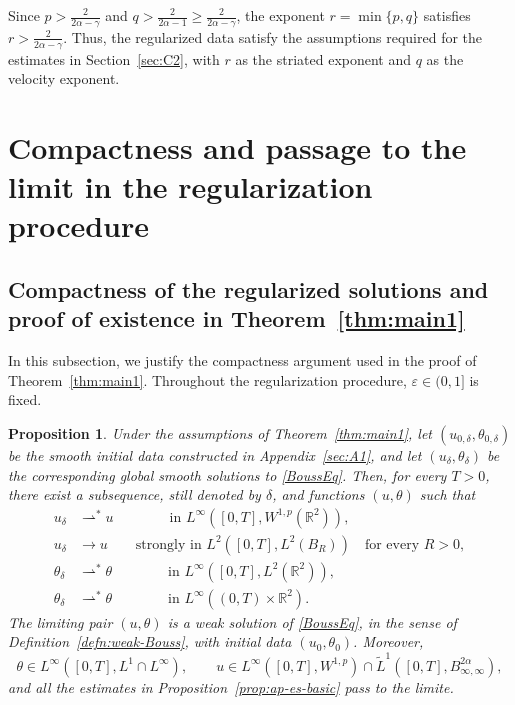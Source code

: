 \documentclass[reqno,11pt,a4paper]{amsart}
\newtheorem{proposition}[theorem]{Proposition}
\begin{document}
Since $p>\frac{2}{2\alpha-\gamma}$ and
$q>\frac{2}{2\alpha-1}\geq\frac{2}{2\alpha-\gamma}$,
the exponent $r=\min\{p,q\}$ satisfies
$r>\frac{2}{2\alpha-\gamma}$.
Thus, the regularized data satisfy the assumptions required for the
estimates in Section~\ref{sec:C2}, with $r$ as the striated
exponent and $q$ as the velocity exponent.

\section{Compactness and passage to the limit in the
regularization procedure}\label{sec:B}

\subsection{Compactness of the regularized solutions and proof of
existence in Theorem~\ref{thm:main1}}
\label{sec:B1}

In this subsection, we justify the compactness argument used in
the proof of Theorem~\ref{thm:main1}.
Throughout the regularization procedure, $\varepsilon\in(0,1]$
is fixed.

\begin{proposition}\label{prop:compactness-main1}
Under the assumptions of Theorem~\ref{thm:main1}, let
$(u_{0,\delta},\theta_{0,\delta})$ be the smooth initial data
constructed in Appendix~\ref{sec:A1}, and let
$(u_\delta,\theta_\delta)$ be the corresponding global smooth
solutions to \eqref{BoussEq}.
Then, for every $T>0$, there exist a subsequence, still denoted
by $\delta$, and functions $(u,\theta)$ such that
\begin{align}
  u_\delta
  &\rightharpoonup^\ast u
  \qquad\qquad\text{in }L^\infty([0,T],W^{1,p}(\mathbb R^2)),
  \label{conv-main1-u-weak}\\
  u_\delta
  &\longrightarrow u
  \qquad\text{strongly in }L^2([0,T],L^2(B_R))
  \quad\text{for every }R>0,
  \label{cov-u-loc}\\
  \theta_\delta
  &\rightharpoonup^\ast\theta
  \qquad\qquad\text{in }L^\infty([0,T],L^2(\mathbb R^2)),
  \label{conv-main1-theta-L2}\\
  \theta_\delta
  &\rightharpoonup^\ast\theta
  \qquad\qquad\text{in }L^\infty((0,T)\times\mathbb R^2).
  \label{conv-main1-theta-Linf}
\end{align}
The limiting pair $(u,\theta)$ is a weak solution of
\eqref{BoussEq}, in the sense of
Definition~\ref{defn:weak-Bouss}, with initial data
$(u_0,\theta_0)$.
Moreover,
\[
  \theta\in L^\infty([0,T],L^1\cap L^\infty),
  \qquad
  u\in L^\infty([0,T],W^{1,p})
  \cap\widetilde L^1([0,T],B_{\infty,\infty}^{2\alpha}),
\]
and all the estimates in Proposition~\ref{prop:ap-es-basic}
pass to the limite.
\end{proposition}
\end{document}
